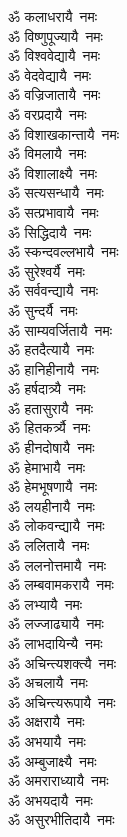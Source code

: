 \begin{flushleft}
\begin{multicols}{2}
ॐ कलाधरायै~नमः\hfill{}\\
ॐ विष्णुपूज्यायै~नमः\\
ॐ विश्ववेद्यायै~नमः\\
ॐ वेदवेद्यायै~नमः\\
ॐ वज्रिजातायै~नमः\\
ॐ वरप्रदायै~नमः\\
ॐ विशाखकान्तायै~नमः\\
ॐ विमलायै~नमः\\
ॐ विशालाक्ष्यै~नमः\\
ॐ सत्यसन्धायै~नमः\\
ॐ सत्प्रभावायै~नमः\hfill{}\\
ॐ सिद्धिदायै~नमः\\
ॐ स्कन्दवल्लभायै~नमः\\
ॐ सुरेश्वर्यै~नमः\\
ॐ सर्ववन्द्यायै~नमः\\
ॐ सुन्दर्यै~नमः\\
ॐ साम्यवर्जितायै~नमः\\
ॐ हतदैत्यायै~नमः\\
ॐ हानिहीनायै~नमः\\
ॐ हर्षदात्र्यै~नमः\\
ॐ हतासुरायै~नमः\hfill{}\\
ॐ हितकर्त्र्यै~नमः\\
ॐ हीनदोषायै~नमः\\
ॐ हेमाभायै~नमः\\
ॐ हेमभूषणायै~नमः\\
ॐ लयहीनायै~नमः\\
ॐ लोकवन्द्यायै~नमः\\
ॐ ललितायै~नमः\\
ॐ ललनोत्तमायै~नमः\\
ॐ लम्बवामकरायै~नमः\\
ॐ लभ्यायै~नमः\hfill{}\\
ॐ लज्जाढ्यायै~नमः\\
ॐ लाभदायिन्यै~नमः\\
ॐ अचिन्त्यशक्त्यै~नमः\\
ॐ अचलायै~नमः\\
ॐ अचिन्त्यरूपायै~नमः\\
ॐ अक्षरायै~नमः\\
ॐ अभयायै~नमः\\
ॐ अम्बुजाक्ष्यै~नमः\\
ॐ अमराराध्यायै~नमः\\
ॐ अभयदायै~नमः\hfill{}\\
ॐ असुरभीतिदायै~नमः\\

\end{multicols}
\end{flushleft}

